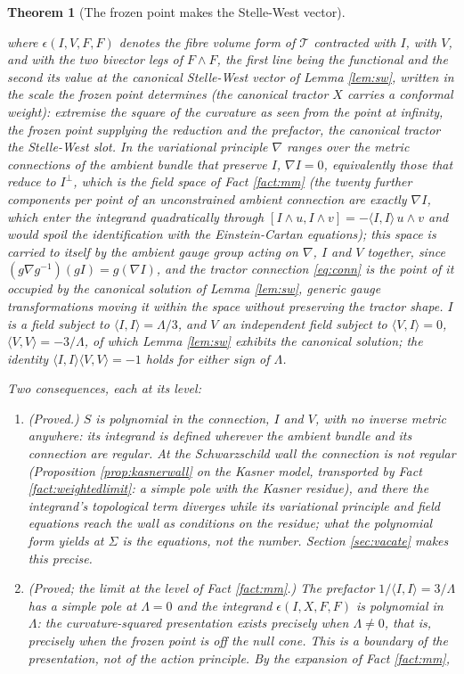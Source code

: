 \documentclass[11pt]{article}
\newtheorem{theorem}{Theorem}[section]
\theoremstyle{definition}
\newcommand{\ip}[2]{\langle #1, #2\rangle}
\begin{document}
\begin{theorem}[The frozen point makes the Stelle-West vector]
\begin{enumerate}
where $\epsilon(I, V, F, F)$ denotes the fibre volume form of $\mathcal{T}$ contracted with $I$, with $V$, and with the two bivector legs of $F\wedge F$, the first line being the functional and the second its value at the canonical Stelle-West vector of Lemma \ref{lem:sw}, written in the scale the frozen point determines (the canonical tractor $X$ carries a conformal weight): \emph{extremise the square of the curvature as seen from the point at infinity}, the frozen point supplying the reduction and the prefactor, the canonical tractor the Stelle-West slot. In the variational principle $\nabla$ ranges over the metric connections of the ambient bundle that preserve $I$, $\nabla I = 0$, equivalently those that reduce to $I^\perp$, which is the field space of Fact \ref{fact:mm} (the twenty further components per point of an unconstrained ambient connection are exactly $\nabla I$, which enter the integrand quadratically through $[I\wedge u, I\wedge v] = -\ip{I}{I}\,u\wedge v$ and would spoil the identification with the Einstein-Cartan equations); this space is carried to itself by the ambient gauge group acting on $\nabla$, $I$ and $V$ together, since $(g\nabla g^{-1})(gI) = g(\nabla I)$, and the tractor connection \eqref{eq:conn} is the point of it occupied by the canonical solution of Lemma \ref{lem:sw}, generic gauge transformations moving it within the space without preserving the tractor shape. $I$ is a field subject to $\ip{I}{I} = \Lambda/3$, and $V$ an independent field subject to $\ip{V}{I} = 0$, $\ip{V}{V} = -3/\Lambda$, of which Lemma \ref{lem:sw} exhibits the canonical solution; the identity $\ip{I}{I}\ip{V}{V} = -1$ holds for either sign of $\Lambda$.
\end{enumerate}
Two consequences, each at its level:
\begin{enumerate}
\item \emph{(Proved.)} $S$ is polynomial in the connection, $I$ and $V$, with no inverse metric anywhere: its integrand is defined wherever the ambient bundle and its connection are regular. At the Schwarzschild wall the connection is not regular (Proposition \ref{prop:kasnerwall} on the Kasner model, transported by Fact \ref{fact:weightedlimit}: a simple pole with the Kasner residue), and there the integrand's topological term diverges while its variational principle and field equations reach the wall as conditions on the residue; what the polynomial form yields at $\Sigma$ is the equations, not the number. Section \ref{sec:vacate} makes this precise.
\item \emph{(Proved; the limit at the level of Fact \ref{fact:mm}.)} The prefactor $1/\ip{I}{I} = 3/\Lambda$ has a simple pole at $\Lambda = 0$ and the integrand $\epsilon(I, X, F, F)$ is polynomial in $\Lambda$: the curvature-squared presentation exists precisely when $\Lambda \neq 0$, that is, precisely when the frozen point is off the null cone. This is a boundary of the presentation, not of the action principle. By the expansion of Fact \ref{fact:mm},

\end{enumerate}
\end{theorem}
\end{document}
